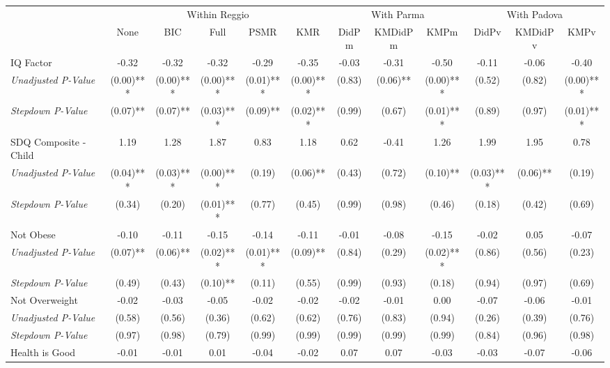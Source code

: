 \begin{tabular}{l c c c c c c c c c c c}
\toprule
& \multicolumn{5}{c}{Within Reggio} & \multicolumn{3}{c}{With Parma} & \multicolumn{3}{c}{With Padova} \\\cmidrule(lr){2-6} \cmidrule(lr){7-9} \cmidrule(lr){10-12}
 & None & BIC & Full & PSMR & KMR & DidPm & KMDidPm & KMPm & DidPv & KMDidPv & KMPv \\
\midrule
IQ Factor & -0.32 & -0.32 & -0.32 & -0.29 & -0.35 & -0.03 & -0.31 & -0.50 & -0.11 & -0.06 & -0.40 \\
\quad \textit{Unadjusted P-Value} & (0.00)*** & (0.00)*** & (0.00)*** & (0.01)*** & (0.00)*** & (0.83) & (0.06)** & (0.00)*** & (0.52) & (0.82) & (0.00)*** \\
\quad \textit{Stepdown P-Value} & (0.07)** & (0.07)** & (0.03)*** & (0.09)** & (0.02)*** & (0.99) & (0.67) & (0.01)*** & (0.89) & (0.97) & (0.01)*** \\
SDQ Composite - Child & 1.19 & 1.28 & 1.87 & 0.83 & 1.18 & 0.62 & -0.41 & 1.26 & 1.99 & 1.95 & 0.78 \\
\quad \textit{Unadjusted P-Value} & (0.04)*** & (0.03)*** & (0.00)*** & (0.19) & (0.06)** & (0.43) & (0.72) & (0.10)** & (0.03)*** & (0.06)** & (0.19) \\
\quad \textit{Stepdown P-Value} & (0.34) & (0.20) & (0.01)*** & (0.77) & (0.45) & (0.99) & (0.98) & (0.46) & (0.18) & (0.42) & (0.69) \\
Not Obese & -0.10 & -0.11 & -0.15 & -0.14 & -0.11 & -0.01 & -0.08 & -0.15 & -0.02 & 0.05 & -0.07 \\
\quad \textit{Unadjusted P-Value} & (0.07)** & (0.06)** & (0.02)*** & (0.01)*** & (0.09)** & (0.84) & (0.29) & (0.02)*** & (0.86) & (0.56) & (0.23) \\
\quad \textit{Stepdown P-Value} & (0.49) & (0.43) & (0.10)** & (0.11) & (0.55) & (0.99) & (0.93) & (0.18) & (0.94) & (0.97) & (0.69) \\
Not Overweight & -0.02 & -0.03 & -0.05 & -0.02 & -0.02 & -0.02 & -0.01 & 0.00 & -0.07 & -0.06 & -0.01 \\
\quad \textit{Unadjusted P-Value} & (0.58) & (0.56) & (0.36) & (0.62) & (0.62) & (0.76) & (0.83) & (0.94) & (0.26) & (0.39) & (0.76) \\
\quad \textit{Stepdown P-Value} & (0.97) & (0.98) & (0.79) & (0.99) & (0.99) & (0.99) & (0.99) & (0.99) & (0.84) & (0.96) & (0.98) \\
Health is Good & -0.01 & -0.01 & 0.01 & -0.04 & -0.02 & 0.07 & 0.07 & -0.03 & -0.03 & -0.07 & -0.06 \\

\end{tabular}
